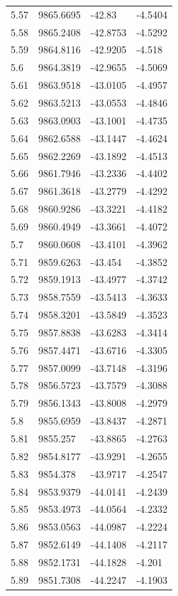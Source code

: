 \begin{table}[H]
\begin{tabular}{llll}
5.57 & 9865.6695 & -42.83 & -4.5404 \\
5.58 & 9865.2408 & -42.8753 & -4.5292 \\
5.59 & 9864.8116 & -42.9205 & -4.518 \\
5.6 & 9864.3819 & -42.9655 & -4.5069 \\
5.61 & 9863.9518 & -43.0105 & -4.4957 \\
5.62 & 9863.5213 & -43.0553 & -4.4846 \\
5.63 & 9863.0903 & -43.1001 & -4.4735 \\
5.64 & 9862.6588 & -43.1447 & -4.4624 \\
5.65 & 9862.2269 & -43.1892 & -4.4513 \\
5.66 & 9861.7946 & -43.2336 & -4.4402 \\
5.67 & 9861.3618 & -43.2779 & -4.4292 \\
5.68 & 9860.9286 & -43.3221 & -4.4182 \\
5.69 & 9860.4949 & -43.3661 & -4.4072 \\
5.7 & 9860.0608 & -43.4101 & -4.3962 \\
5.71 & 9859.6263 & -43.454 & -4.3852 \\
5.72 & 9859.1913 & -43.4977 & -4.3742 \\
5.73 & 9858.7559 & -43.5413 & -4.3633 \\
5.74 & 9858.3201 & -43.5849 & -4.3523 \\
5.75 & 9857.8838 & -43.6283 & -4.3414 \\
5.76 & 9857.4471 & -43.6716 & -4.3305 \\
5.77 & 9857.0099 & -43.7148 & -4.3196 \\
5.78 & 9856.5723 & -43.7579 & -4.3088 \\
5.79 & 9856.1343 & -43.8008 & -4.2979 \\
5.8 & 9855.6959 & -43.8437 & -4.2871 \\
5.81 & 9855.257 & -43.8865 & -4.2763 \\
5.82 & 9854.8177 & -43.9291 & -4.2655 \\
5.83 & 9854.378 & -43.9717 & -4.2547 \\
5.84 & 9853.9379 & -44.0141 & -4.2439 \\
5.85 & 9853.4973 & -44.0564 & -4.2332 \\
5.86 & 9853.0563 & -44.0987 & -4.2224 \\
5.87 & 9852.6149 & -44.1408 & -4.2117 \\
5.88 & 9852.1731 & -44.1828 & -4.201 \\
5.89 & 9851.7308 & -44.2247 & -4.1903 \\

\end{tabular}
\end{table}

